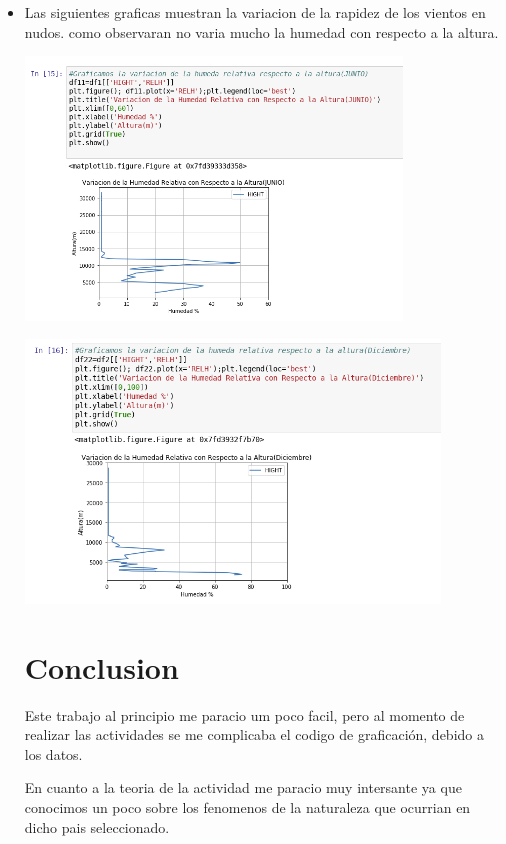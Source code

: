 \documentclass{article}
\begin{document}
\begin{itemize}
 
 \item
 Las siguientes graficas muestran la variacion de la rapidez de los vientos en nudos. como observaran no varia mucho la humedad con respecto a la altura.
 
  \begin{center}
\includegraphics[height=7cm]{3_14.png}
\end{center}


\begin{center}
\includegraphics[height=7cm]{3_15.png}
\end{center}
 
 
 \section{Conclusion}
 
 Este trabajo al principio me paracio um poco facil, pero al momento de realizar las actividades se me complicaba el codigo de graficación, debido a los datos.
 
En cuanto a la teoria de la actividad me paracio muy intersante ya que conocimos un poco sobre los fenomenos de la naturaleza que ocurrian en dicho pais seleccionado.


\end{itemize}
\end{document}
